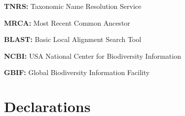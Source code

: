 \documentclass{bmcart}
\begin{document}
\textbf{TNRS:} Taxonomic Name Resolution Service

\textbf{MRCA:} Most Recent Common Ancestor

\textbf{BLAST:} Basic Local Alignment Search Tool

\textbf{NCBI:} USA National Center for Biodiversity Information

\textbf{GBIF:} Global Biodiversity Information Facility

\section*{Declarations}
\end{document}
